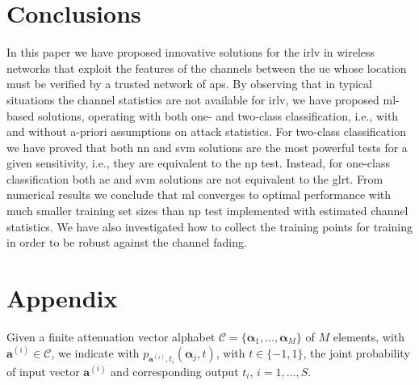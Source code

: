 \documentclass[draftcls,onecolumn,12pt]{IEEEtran}
\begin{document}
\section{Conclusions}

In this paper we have proposed innovative solutions for the \ac{irlv} in wireless networks that exploit the  features of the channels between the \ac{ue} whose location must be verified by a trusted network of \acp{ap}. By observing that in typical situations the channel statistics are not available for \ac{irlv}, we have proposed \ac{ml}-based solutions, operating with both one- and two-class classification, i.e., with and without a-priori assumptions on attack statistics. For two-class classification we have proved that  both \ac{nn} and \ac{svm} solutions  are the most powerful tests for a given sensitivity, i.e., they are equivalent to the \ac{np} test. Instead, for one-class classification both \ac{ae} and \ac{svm} solutions are not equivalent to the \ac{glrt}. From numerical results we conclude that \ac{ml} converges to optimal performance with much smaller training set sizes than \ac{np} test implemented with estimated channel statistics. We have also investigated how to collect the training points for training in order to be robust against the channel fading.

\section*{Appendix}

	Given a finite  attenuation vector alphabet $\mathcal C = \{\bm{\alpha}_1, \ldots, \bm{\alpha}_M\}$ of $M$ elements, with $\bm{a}^{(i)} \in \mathcal C$, we indicate with $p_{\bm{a}^{(i)},t_i}(\bm{\alpha}_j, t)$, with $t \in \{-1,1\}$, the joint probability of input vector $\bm{a}^{(i)}$ and corresponding output $t_i$, $i=1, \ldots, S$.
	
\end{document}
